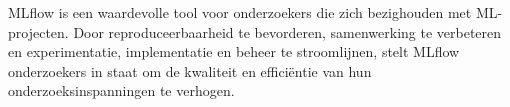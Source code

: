         
    
MLflow is een waardevolle tool voor onderzoekers die zich bezighouden met ML-projecten. Door reproduceerbaarheid te bevorderen, samenwerking te verbeteren en experimentatie, implementatie en beheer te stroomlijnen, stelt MLflow onderzoekers in staat om de kwaliteit en efficiëntie van hun onderzoeksinspanningen te verhogen.
